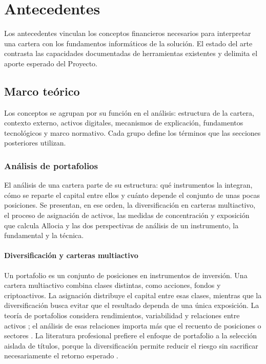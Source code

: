 \chapter{Antecedentes}\label{chap:antecedentes}

Los antecedentes vinculan los conceptos financieros necesarios para interpretar una cartera con los fundamentos informáticos de la solución. El estado del arte contrasta las capacidades documentadas de herramientas existentes y delimita el aporte esperado del Proyecto.

\section{Marco teórico}\label{sec:marco-teorico}

Los conceptos se agrupan por su función en el análisis: estructura de la cartera, contexto externo, activos digitales, mecanismos de explicación, fundamentos tecnológicos y marco normativo. Cada grupo define los términos que las secciones posteriores utilizan.

\subsection{Análisis de portafolios}\label{subsec:portafolios-diversificacion}

El análisis de una cartera parte de su estructura: qué instrumentos la integran, cómo se reparte el capital entre ellos y cuánto depende el conjunto de unas pocas posiciones. Se presentan, en ese orden, la diversificación en carteras multiactivo, el proceso de asignación de activos, las medidas de concentración y exposición que calcula Allocia y las dos perspectivas de análisis de un instrumento, la fundamental y la técnica.

\subsubsection{Diversificación y carteras multiactivo}\label{subsec:portafolios-multiactivo}

Un portafolio es un conjunto de posiciones en instrumentos de inversión. Una cartera multiactivo combina clases distintas, como acciones, fondos y criptoactivos. La asignación distribuye el capital entre esas clases, mientras que la diversificación busca evitar que el resultado dependa de una única exposición. La teoría de portafolios considera rendimientos, variabilidad y relaciones entre activos \parencite{Markowitz1952}; el análisis de esas relaciones importa más que el recuento de posiciones o sectores \parencite{SECAssetAllocation}. La literatura profesional prefiere el enfoque de portafolio a la selección aislada de títulos, porque la diversificación permite reducir el riesgo sin sacrificar necesariamente el retorno esperado \parencite{CFA2026portfolio}.

